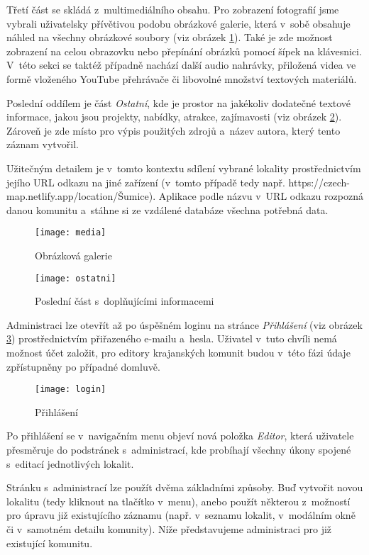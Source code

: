 Třetí část se skládá z~multimediálního obsahu. Pro zobrazení fotografií jsme vybrali uživatelsky přívětivou podobu obrázkové galerie, která v~sobě obsahuje náhled na všechny obrázkové soubory (viz obrázek \ref{media}). Také je zde možnost zobrazení na celou obrazovku nebo přepínání obrázků pomocí šípek na klávesnici. V~této sekci se taktéž případně nachází další audio nahrávky, přiložená videa ve formě vloženého YouTube přehrávače či libovolné množství textových materiálů.

Poslední oddílem je část \emph{Ostatní}, kde je prostor na jakékoliv dodatečné textové informace, jakou jsou projekty, nabídky, atrakce, zajímavosti (viz obrázek \ref{ostatni}). Zároveň je zde místo pro výpis použitých zdrojů a~název autora, který tento záznam vytvořil.

Užitečným detailem je v~tomto kontextu sdílení vybrané lokality prostřednictvím jejího URL odkazu na jiné zařízení (v~tomto případě tedy např. https://czech-map.netlify.app/location/Šumice). Aplikace podle názvu v~URL odkazu rozpozná danou komunitu a~stáhne si ze vzdálené databáze všechna potřebná data.

\begin{figure}  
    \centering
    \texttt{[image: media]}  
    \caption{Obrázková galerie}
    \label{media}
\end{figure}

\begin{figure} 
    \centering
    \texttt{[image: ostatni]}  
    \caption{Poslední část s~doplňujícími informacemi}
    \label{ostatni}
\end{figure}

Administraci lze otevřít až po úspěšném loginu na stránce \emph{Přihlášení} (viz obrázek \ref{login}) prostřednictvím přiřazeného e-mailu a~hesla. Uživatel v~tuto chvíli nemá možnost účet založit, pro editory krajanských komunit budou v~této fázi údaje zpřístupněny po případné domluvě.

\begin{figure}
    \centering
    \texttt{[image: login]}  
    \caption{Přihlášení}
    \label{login}
\end{figure}

Po přihlášení se v~navigačním menu objeví nová položka \emph{Editor}, která uživatele přesměruje do podstránek s~administrací, kde probíhají všechny úkony spojené s~editací jednotlivých lokalit.

Stránku s~administrací lze použít dvěma základními způsoby. Buď vytvořit novou lokalitu (tedy kliknout na tlačítko v~menu), anebo použít některou z~možností pro úpravu již existujícího záznamu (např. v~seznamu lokalit, v~modálním okně či v~samotném detailu komunity). Níže představujeme administraci pro již existující komunitu.


